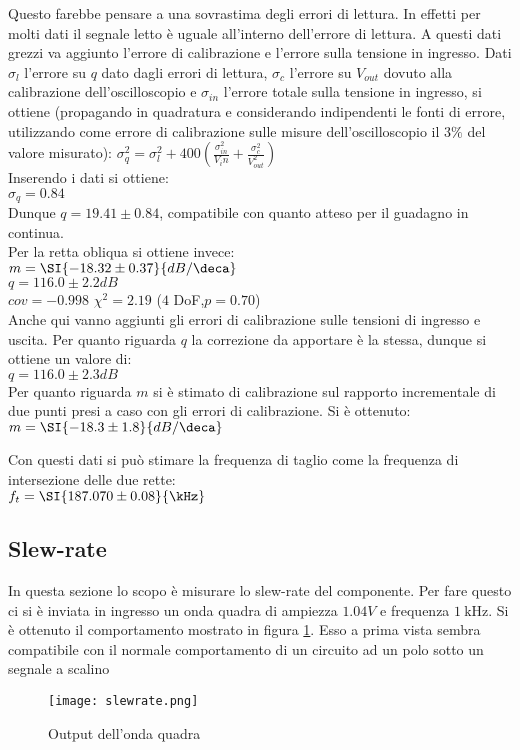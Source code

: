 Questo farebbe pensare a una sovrastima degli errori di lettura. In effetti per molti dati il segnale letto è uguale all'interno dell'errore di lettura.
A questi dati grezzi va aggiunto l'errore di calibrazione e l'errore sulla tensione in ingresso. 
Dati $\sigma_l$ l'errore su $q$ dato dagli errori di lettura, $\sigma_c$ l'errore su $V_{out}$ dovuto alla calibrazione dell'oscilloscopio e $\sigma_{in}$ l'errore totale sulla tensione in ingresso, si ottiene (propagando in quadratura e considerando indipendenti le fonti di errore, utilizzando come errore di calibrazione sulle misure dell'oscilloscopio il $3\%$ del valore misurato):
$\sigma_q^2=\sigma_l^2+400(\frac{\sigma_{in}^2}{V_in}+\frac{\sigma_c^2}{V_{out}^2})$\\
Inserendo i dati si ottiene:\\
$\sigma_q=0.84$\\
Dunque $q=19.41\pm 0.84$, compatibile con quanto atteso per il guadagno in continua.\\
Per la retta obliqua si ottiene invece:\\
$m =\SI{-18.32 \pm 0.37}{ dB/\deca}$\\
$q = 116.0 \pm 2.2 dB$\\
$cov=-0.998$
$\chi^2 =2.19$ ($4$ DoF,$ p = 0.70$)\\

Anche qui vanno aggiunti gli errori di calibrazione sulle tensioni di ingresso e uscita. 
Per quanto riguarda $q$ la correzione da apportare è la stessa, dunque si ottiene un valore di:\\
$q=116.0 \pm 2.3 dB$\\
Per quanto riguarda $m$ si è stimato di calibrazione sul rapporto incrementale di due punti presi a caso con gli errori di calibrazione. Si è ottenuto:
$m=\SI{-18.3 \pm 1.8}{ dB/\deca}$

Con questi dati si può stimare la frequenza di taglio come la frequenza di intersezione delle due rette:\\
$f_t=\SI{187.070\pm 0.08}{\kHz}$ %

\subsection{Slew-rate}
In questa sezione lo scopo è misurare lo slew-rate del componente. Per fare questo ci si è inviata in ingresso un onda quadra di ampiezza $1.04 V$ e frequenza $\SI{1}{\kHz}$. Si è ottenuto il comportamento mostrato in figura \ref{f:SLWRT}. Esso a prima vista sembra compatibile con il normale comportamento di un circuito ad un polo sotto un segnale a scalino %
\begin{figure}[h]
	\centering
	\texttt{[image: slewrate.png]}
	\caption{Output dell'onda quadra}
	\label{f:SLWRT}
\end{figure}

